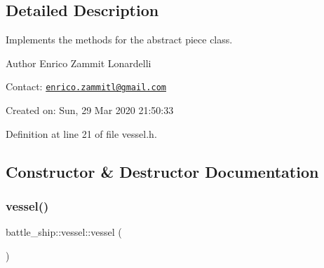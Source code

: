 \subsection{Detailed Description}
Implements the methods for the abstract piece class. 

\begin{DoxyAuthor}{Author}
Enrico Zammit Lonardelli
\end{DoxyAuthor}
Contact\+: \href{mailto:enrico.zammitl@gmail.com}{\tt enrico.\+zammitl@gmail.\+com}

Created on\+: Sun, 29 Mar 2020 21\+:50\+:33 

Definition at line 21 of file vessel.\+h.



\subsection{Constructor \& Destructor Documentation}
\mbox{\label{classbattle__ship_1_1vessel_a6f3be9c2343940c262fb7add97402311}} 
\subsubsection{\texorpdfstring{vessel()}{vessel()}\hspace{0.1cm}{\footnotesize\ttfamily [1/2]}}
{\footnotesize\ttfamily battle\+\_\+ship\+::vessel\+::vessel (\begin{DoxyParamCaption}{ }\end{DoxyParamCaption})\hspace{0.3cm}{\ttfamily [default]}}

\mbox{\label{classbattle__ship_1_1vessel_ade7f1d4ee4b458a715a0259e5211db20}} 
